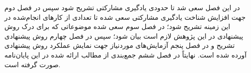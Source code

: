 در این فصل سعی شد تا حدودی یادگیری مشارکتی تشریح شود سپس در فصل دوم جهت افزایش شناخت یادگیری مشارکتی سعی شده تا تعدادی از کارهای انجام‌شده در این زمینه تشریح شود؛ در فصل سوم سعی شده موضوعاتی که برای درک روش پیشنهادی در این پژوهش لازم است بیان شود؛ سپس در فصل چهارم روش پیشنهادی تشریح و در فصل پنجم آزمایش‌های موردنیاز جهت نمایش عملکرد روش پیشنهادی آورده شده است. نهایتاً در فصل ششم جمع‌بندی از مطالب ارائه شده در این پایان‌نامه صورت گرفته است.

